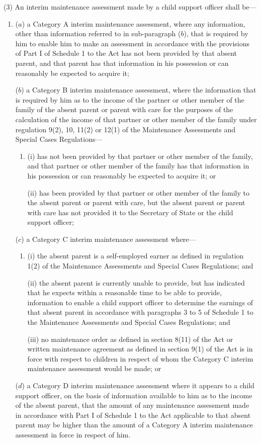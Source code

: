 \documentclass[a4paper]{article}
\begin{document}
(3) An interim maintenance assessment made by a child support officer shall be—
\begin{enumerate}\item[]
($a$) a Category A interim maintenance assessment, where any information, other than information referred to in sub-paragraph ($b$), that is required by him to enable him to make an assessment in accordance with the provisions of Part I of Schedule 1 to the Act has not been provided by that absent parent, and that parent has that information in his possession or can reasonably be expected to acquire it;

($b$) a Category B interim maintenance assessment, where the information that is required by him as to the income of the partner or other member of the family of the absent parent or parent with care for the purposes of the calculation of the income of that partner or other member of the family under regulation 9(2), 10, 11(2) or 12(1) of the Maintenance Assessments and Special Cases Regulations—
\begin{enumerate}\item[]
(i) has not been provided by that partner or other member of the family, and that partner or other member of the family has that information in his possession or can reasonably be expected to acquire it; or

(ii) has been provided by that partner or other member of the family to the absent parent or parent with care, but the absent parent or parent with care has not provided it to the Secretary of State or the child support officer;
\end{enumerate}

($c$) a Category C interim maintenance assessment where—
\begin{enumerate}\item[]
(i) the absent parent is a self-employed earner as defined in regulation 1(2) of the Maintenance Assessments and Special Cases Regulations; and

(ii) the absent parent is currently unable to provide, but has indicated that he expects within a reasonable time to be able to provide, information to enable a child support officer to determine the earnings of that absent parent in accordance with paragraphs 3 to 5 of Schedule 1 to the Maintenance Assessments and Special Cases Regulations; and

(iii) no maintenance order as defined in section 8(11) of the Act or written maintenance agreement as defined in section 9(1) of the Act is in force with respect to children in respect of whom the Category C interim maintenance assessment would be made; or
\end{enumerate}

($d$) a Category D interim maintenance assessment where it appears to a child support officer, on the basis of information available to him as to the income of the absent parent, that the amount of any maintenance assessment made in accordance with Part I of Schedule 1 to the Act applicable to that absent parent may be higher than the amount of a Category A interim maintenance assessment in force in respect of him.
\end{enumerate}
\end{document}
